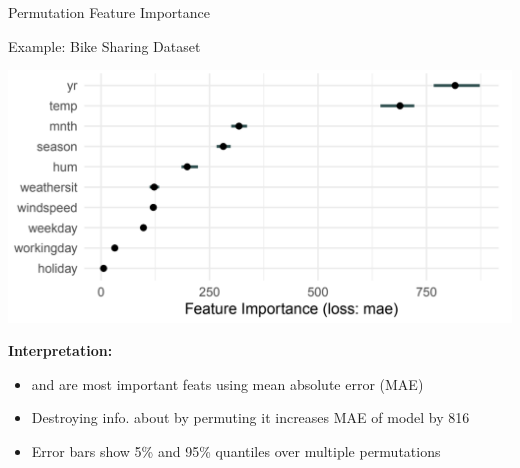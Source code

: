 \documentclass[10pt,compress,t,notes=noshow, xcolor=table]{beamer}
\begin{document}
\begin{frame}{Permutation Feature Importance}
\begin{itemize}
  \end{itemize}
\end{frame}

\begin{frame}{Example: Bike Sharing Dataset}

\begin{center}
\includegraphics[width=\textwidth]{figure_man/bike-sharing02.png}
\end{center}

\textbf{Interpretation:}

\begin{itemize}
 \item {} and  are most important feats using mean absolute error (MAE)
 \item Destroying info. about  by permuting it increases MAE of model by 816
 \item Error bars show 5\% and 95\% quantiles over multiple permutations
\end{itemize}
\end{frame}
\end{document}
